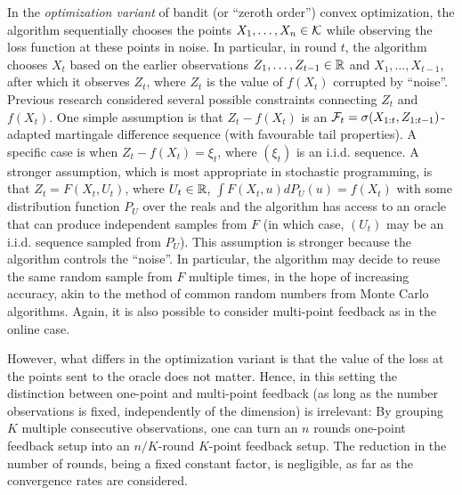 In the \emph{optimization variant} of bandit (or ``zeroth order'') convex optimization, 
the algorithm sequentially chooses the points $X_1,\dots,X_n\in \mathcal{K}$ while observing the loss function at these points in noise.
In particular, in round $t$, the algorithm chooses $X_t$ based on the earlier observations $Z_1,\dots,Z_{t-1}\in \mathbb{R}$ and $X_1,\dots,X_{t-1}$, after which it observes $Z_t$, where $Z_t$ is the value of $f(X_t)$ corrupted by ``noise''.
Previous research considered several possible constraints connecting $Z_t$ and $f(X_t)$.
One simple assumption is that $Z_t-f(X_t)$ is an $\mathcal{F}_t = \sigma(X_{1:t},Z_{1:t-1})$-adapted martingale difference sequence (with favourable tail properties). 
A specific case is when $Z_t - f(X_t) = \xi_t$, where $(\xi_t)$ is an i.i.d. sequence.
A stronger assumption, which is most appropriate in stochastic programming, 
is that $Z_t = F(X_t,U_t)$, where $U_t\in \mathbb{R}$, $\int F(X_t,u) dP_U(u) = f(X_t)$ with some distribution function $P_U$ over the reals and the algorithm has access to an oracle that can produce independent samples from $F$ (in which case, $(U_t)$ may be an i.i.d. sequence sampled from $P_U$).
This assumption is stronger because the algorithm controls the
``noise''. 
In particular, the algorithm may decide to reuse the same random sample from $F$ multiple times, 
in the hope of increasing accuracy, akin to the method of common random numbers from Monte Carlo algorithms.
Again, it is also possible to consider multi-point feedback as in the online case.

However, what differs in the optimization variant is that the value of the loss at the points sent to the oracle does not matter.
Hence, in this setting the distinction between one-point and multi-point feedback (as long as the number observations is fixed, independently of the dimension) is irrelevant: 
By grouping $K$ multiple consecutive observations, one can turn an $n$ rounds one-point feedback setup into an $n/K$-round $K$-point feedback setup. The reduction in the number of rounds, being a fixed constant factor, is negligible, as far as the convergence rates are considered.

